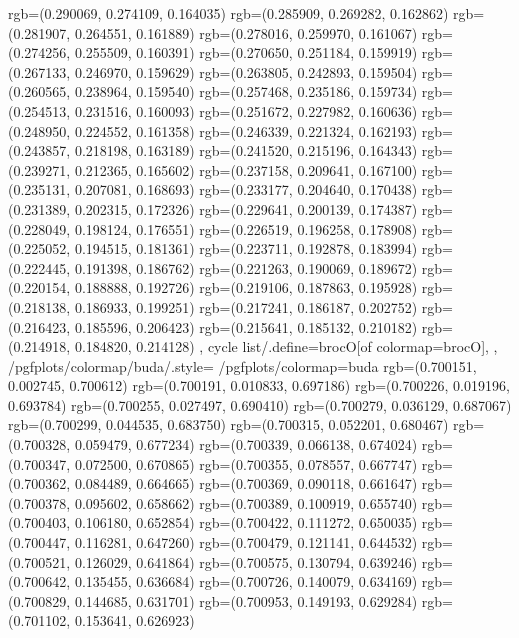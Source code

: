 {{{					rgb=(0.290069, 0.274109, 0.164035)
					rgb=(0.285909, 0.269282, 0.162862)
					rgb=(0.281907, 0.264551, 0.161889)
					rgb=(0.278016, 0.259970, 0.161067)
					rgb=(0.274256, 0.255509, 0.160391)
					rgb=(0.270650, 0.251184, 0.159919)
					rgb=(0.267133, 0.246970, 0.159629)
					rgb=(0.263805, 0.242893, 0.159504)
					rgb=(0.260565, 0.238964, 0.159540)
					rgb=(0.257468, 0.235186, 0.159734)
					rgb=(0.254513, 0.231516, 0.160093)
					rgb=(0.251672, 0.227982, 0.160636)
					rgb=(0.248950, 0.224552, 0.161358)
					rgb=(0.246339, 0.221324, 0.162193)
					rgb=(0.243857, 0.218198, 0.163189)
					rgb=(0.241520, 0.215196, 0.164343)
					rgb=(0.239271, 0.212365, 0.165602)
					rgb=(0.237158, 0.209641, 0.167100)
					rgb=(0.235131, 0.207081, 0.168693)
					rgb=(0.233177, 0.204640, 0.170438)
					rgb=(0.231389, 0.202315, 0.172326)
					rgb=(0.229641, 0.200139, 0.174387)
					rgb=(0.228049, 0.198124, 0.176551)
					rgb=(0.226519, 0.196258, 0.178908)
					rgb=(0.225052, 0.194515, 0.181361)
					rgb=(0.223711, 0.192878, 0.183994)
					rgb=(0.222445, 0.191398, 0.186762)
					rgb=(0.221263, 0.190069, 0.189672)
					rgb=(0.220154, 0.188888, 0.192726)
					rgb=(0.219106, 0.187863, 0.195928)
					rgb=(0.218138, 0.186933, 0.199251)
					rgb=(0.217241, 0.186187, 0.202752)
					rgb=(0.216423, 0.185596, 0.206423)
					rgb=(0.215641, 0.185132, 0.210182)
					rgb=(0.214918, 0.184820, 0.214128)
			},
		cycle list/.define={brocO}{[of colormap=brocO]},
		},
		/pgfplots/colormap/buda/.style={
			/pgfplots/colormap={buda}{%
					rgb=(0.700151, 0.002745, 0.700612)
					rgb=(0.700191, 0.010833, 0.697186)
					rgb=(0.700226, 0.019196, 0.693784)
					rgb=(0.700255, 0.027497, 0.690410)
					rgb=(0.700279, 0.036129, 0.687067)
					rgb=(0.700299, 0.044535, 0.683750)
					rgb=(0.700315, 0.052201, 0.680467)
					rgb=(0.700328, 0.059479, 0.677234)
					rgb=(0.700339, 0.066138, 0.674024)
					rgb=(0.700347, 0.072500, 0.670865)
					rgb=(0.700355, 0.078557, 0.667747)
					rgb=(0.700362, 0.084489, 0.664665)
					rgb=(0.700369, 0.090118, 0.661647)
					rgb=(0.700378, 0.095602, 0.658662)
					rgb=(0.700389, 0.100919, 0.655740)
					rgb=(0.700403, 0.106180, 0.652854)
					rgb=(0.700422, 0.111272, 0.650035)
					rgb=(0.700447, 0.116281, 0.647260)
					rgb=(0.700479, 0.121141, 0.644532)
					rgb=(0.700521, 0.126029, 0.641864)
					rgb=(0.700575, 0.130794, 0.639246)
					rgb=(0.700642, 0.135455, 0.636684)
					rgb=(0.700726, 0.140079, 0.634169)
					rgb=(0.700829, 0.144685, 0.631701)
					rgb=(0.700953, 0.149193, 0.629284)
					rgb=(0.701102, 0.153641, 0.626923)
}}}
